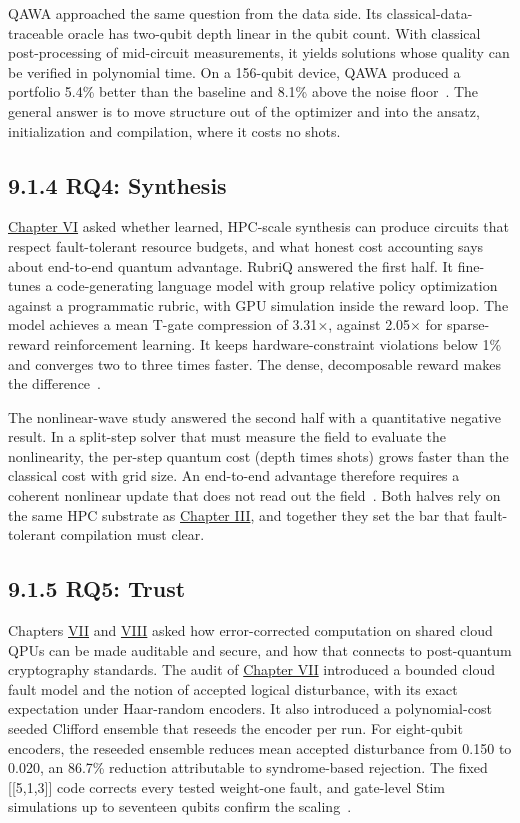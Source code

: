 \documentclass{report}
\theoremstyle{plain}
\theoremstyle{definition}
\theoremstyle{remark}
\begin{document}
QAWA approached the same question from the data side. Its classical-data-traceable oracle has two-qubit depth linear in the qubit count. With classical post-processing of mid-circuit measurements, it yields solutions whose quality can be verified in polynomial time. On a 156-qubit device, QAWA produced a portfolio 5.4\% better than the baseline and 8.1\% above the noise floor~\cite{guo2025qawa}. The general answer is to move structure out of the optimizer and into the ansatz, initialization and compilation, where it costs no shots.

\subsection{9.1.4 RQ4: Synthesis}\label{sec:conclusion:rq4}

\hyperref[ch:synthesis]{Chapter VI} asked whether learned, HPC-scale synthesis can produce circuits that respect fault-tolerant resource budgets, and what honest cost accounting says about end-to-end quantum advantage. RubriQ answered the first half. It fine-tunes a code-generating language model with group relative policy optimization against a programmatic rubric, with GPU simulation inside the reward loop. The model achieves a mean T-gate compression of 3.31$\times$, against 2.05$\times$ for sparse-reward reinforcement learning. It keeps hardware-constraint violations below 1\% and converges two to three times faster. The dense, decomposable reward makes the difference~\cite{guo2026rubriq}.

The nonlinear-wave study answered the second half with a quantitative negative result. In a split-step solver that must measure the field to evaluate the nonlinearity, the per-step quantum cost (depth times shots) grows faster than the classical cost with grid size. An end-to-end advantage therefore requires a coherent nonlinear update that does not read out the field~\cite{guo2026nonlinearwaves}. Both halves rely on the same HPC substrate as \hyperref[ch:qgear]{Chapter III}, and together they set the bar that fault-tolerant compilation must clear.

\subsection{9.1.5 RQ5: Trust}\label{sec:conclusion:rq5}

Chapters \hyperref[ch:qec]{VII} and \hyperref[ch:pqc]{VIII} asked how error-corrected computation on shared cloud QPUs can be made auditable and secure, and how that connects to post-quantum cryptography standards. The audit of \hyperref[ch:qec]{Chapter VII} introduced a bounded cloud fault model and the notion of accepted logical disturbance, with its exact expectation under Haar-random encoders. It also introduced a polynomial-cost seeded Clifford ensemble that reseeds the encoder per run. For eight-qubit encoders, the reseeded ensemble reduces mean accepted disturbance from 0.150 to 0.020, an 86.7\% reduction attributable to syndrome-based rejection. The fixed [[5,1,3]] code corrects every tested weight-one fault, and gate-level Stim simulations up to seventeen qubits confirm the scaling~\cite{guo2026qecaudit}.
\end{document}
